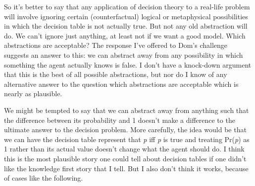 \documentclass[
  10pt,
  letterpaper,
  DIV=11,
  numbers=noendperiod,
  twoside]{scrartcl}
\begin{document}
So it's better to say that any application of decision theory to a
real-life problem will involve ignoring certain (counterfactual) logical
or metaphysical possibilities in which the decision table is not
actually true. But not any old abstraction will do. We can't ignore just
anything, at least not if we want a good model. Which abstractions are
acceptable? The response I've offered to Dom's challenge suggests an
answer to this: we can abstract away from any possibility in which
something the agent actually knows is false. I don't have a knock-down
argument that this is the best of all possible abstractions, but nor do
I know of any alternative answer to the question which abstractions are
acceptable which is nearly as plausible.

We might be tempted to say that we can abstract away from anything such
that the difference between its probability and 1 doesn't make a
difference to the ultimate answer to the decision problem. More
carefully, the idea would be that we can have the decision table
represent that \emph{p} iff \emph{p} is true and treating Pr(\emph{p})
as 1 rather than its actual value doesn't change what the agent should
do. I think this is the most plausible story one could tell about
decision tables if one didn't like the knowledge first story that I
tell. But I also don't think it works, because of cases like the
following.
\end{document}
